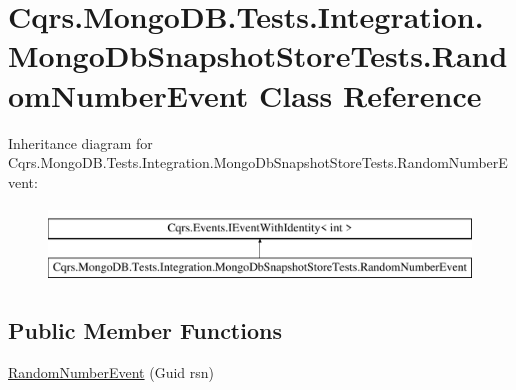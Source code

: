 \hypertarget{classCqrs_1_1MongoDB_1_1Tests_1_1Integration_1_1MongoDbSnapshotStoreTests_1_1RandomNumberEvent}{}\section{Cqrs.\+Mongo\+D\+B.\+Tests.\+Integration.\+Mongo\+Db\+Snapshot\+Store\+Tests.\+Random\+Number\+Event Class Reference}
\label{classCqrs_1_1MongoDB_1_1Tests_1_1Integration_1_1MongoDbSnapshotStoreTests_1_1RandomNumberEvent}


 


Inheritance diagram for Cqrs.\+Mongo\+D\+B.\+Tests.\+Integration.\+Mongo\+Db\+Snapshot\+Store\+Tests.\+Random\+Number\+Event\+:\begin{figure}[H]
\begin{center}
\leavevmode
\includegraphics[height=2.000000cm]{classCqrs_1_1MongoDB_1_1Tests_1_1Integration_1_1MongoDbSnapshotStoreTests_1_1RandomNumberEvent}
\end{center}
\end{figure}
\subsection*{Public Member Functions}
\begin{DoxyCompactItemize}
\item 
\hyperlink{classCqrs_1_1MongoDB_1_1Tests_1_1Integration_1_1MongoDbSnapshotStoreTests_1_1RandomNumberEvent_a23882756b525adabdd4af4df7e54df5d_a23882756b525adabdd4af4df7e54df5d}{Random\+Number\+Event} (Guid rsn)
\end{DoxyCompactItemize}
